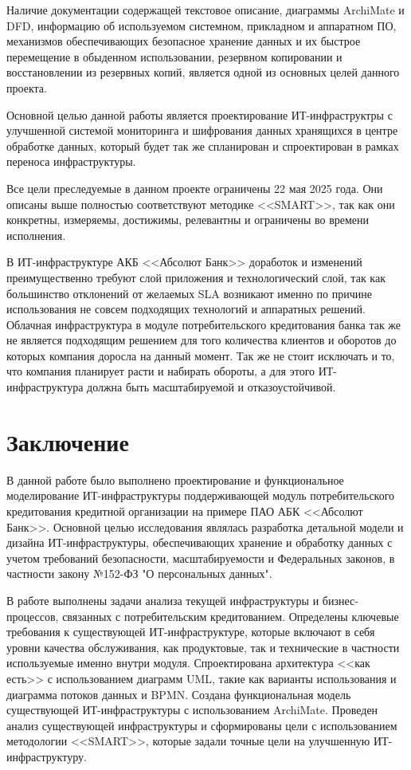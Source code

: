 \documentclass[14pt, a4paper]{extarticle}
\begin{document}
Наличие документации содержащей текстовое описание, диаграммы ArchiMate и
DFD\cite{dfd},
информацию об используемом системном, прикладном и аппаратном ПО, механизмов
обеспечивающих безопасное хранение данных и их быстрое перемещение в обыденном
использовании, резервном копировании и восстановлении из резервных копий,
является одной из основных целей данного проекта.

Основной целью данной работы является проектирование ИТ-инфраструктры с
улучшенной системой мониторинга и шифрования данных хранящихся в центре
обработке данных, который будет так же спланирован и спроектирован в рамках
переноса инфраструктуры.

Все цели преследуемые в данном проекте ограничены 22 мая 2025 года. Они описаны
выше полностью соответствуют методике <<SMART>>, так как они конкретны,
измеряемы, достижимы, релевантны и ограничены во времени исполнения.

В ИТ-инфраструктуре АКБ <<Абсолют Банк>> доработок и изменений преимущественно
требуют слой приложения и технологический слой, так как большинство отклонений
от желаемых SLA возникают именно по причине использования не совсем подходящих
технологий и аппаратных решений. Облачная инфраструктура в модуле
потребительского кредитования банка так же не является подходящим решением для
того количества клиентов и оборотов до которых компания доросла на данный
момент. Так же не стоит исключать и то, что компания планирует расти и набирать
обороты, а для этого ИТ-инфраструктура должна быть масштабируемой и
отказоустойчивой.

\section{Заключение}

В данной работе было выполнено проектирование и функциональное моделирование
ИТ-инфраструктуры поддерживающей модуль потребительского кредитования кредитной
организации на примере ПАО АБК <<Абсолют Банк>>. Основной целью
исследования являлась разработка детальной модели и дизайна ИТ-инфраструктуры,
обеспечивающих хранение и обработку данных с учетом требований безопасности,
масштабируемости и Федеральных законов, в частности закону №152-ФЗ "О
персональных данных".

В работе выполнены задачи анализа текущей инфраструктуры и бизнес-процессов,
связанных с потребительским кредитованием. Определены ключевые требования к
существующей ИТ-инфраструктуре, которые включают в себя уровни
качества обслуживания, как продуктовые, так и технические в частности
используемые именно внутри модуля. Спроектирована архитектура <<как есть>> с
использованием диаграмм UML, такие как варианты использования и диаграмма
потоков данных и BPMN. Создана функциональная модель существующей
ИТ-инфраструктуры с использованием ArchiMate. Проведен анализ существующей
инфраструктуры и сформированы цели с использованием методологии <<SMART>>,
которые задали точные цели на улучшенную ИТ-инфраструктуру.
\end{document}
